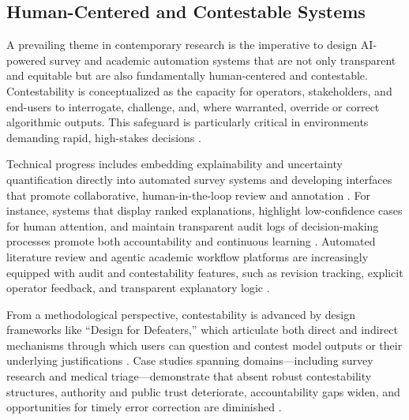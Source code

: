 \documentclass[sigconf]{acmart}
\begin{document}
\subsection{Human-Centered and Contestable Systems}

A prevailing theme in contemporary research is the imperative to design AI-powered survey and academic automation systems that are not only transparent and equitable but are also fundamentally human-centered and contestable. Contestability is conceptualized as the capacity for operators, stakeholders, and end-users to interrogate, challenge, and, where warranted, override or correct algorithmic outputs. This safeguard is particularly critical in environments demanding rapid, high-stakes decisions \cite{ref39}\cite{ref76}\cite{ref80}\cite{ref83}\cite{ref85}\cite{ref92}\cite{ref94}\cite{ref96}\cite{ref100}\cite{ref105}\cite{ref106}.

Technical progress includes embedding explainability and uncertainty quantification directly into automated survey systems and developing interfaces that promote collaborative, human-in-the-loop review and annotation \cite{ref39}\cite{ref80}\cite{ref83}\cite{ref85}\cite{ref100}\cite{ref105}\cite{ref106}. For instance, systems that display ranked explanations, highlight low-confidence cases for human attention, and maintain transparent audit logs of decision-making processes promote both accountability and continuous learning \cite{ref76}\cite{ref80}\cite{ref85}\cite{ref100}\cite{ref105}. Automated literature review and agentic academic workflow platforms are increasingly equipped with audit and contestability features, such as revision tracking, explicit operator feedback, and transparent explanatory logic \cite{ref76}\cite{ref80}\cite{ref102}\cite{ref103}\cite{ref105}.

From a methodological perspective, contestability is advanced by design frameworks like ``Design for Defeaters,'' which articulate both direct and indirect mechanisms through which users can question and contest model outputs or their underlying justifications \cite{ref85}\cite{ref92}\cite{ref94}. Case studies spanning domains—including survey research and medical triage—demonstrate that absent robust contestability structures, authority and public trust deteriorate, accountability gaps widen, and opportunities for timely error correction are diminished \cite{ref39}\cite{ref80}\cite{ref85}\cite{ref92}\cite{ref94}.
\end{document}
